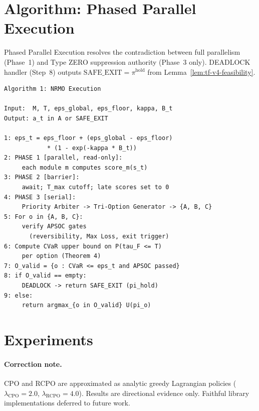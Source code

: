 \section{Algorithm: Phased Parallel Execution}
\label{sec:tf-v4-algorithm}

Phased Parallel Execution resolves the contradiction between full
parallelism (Phase~1) and Type ZERO suppression authority (Phase~3
only). DEADLOCK handler (Step~8) outputs $\mathrm{SAFE\_EXIT} =
\pi^{\mathrm{hold}}$ from Lemma~\ref{lem:tf-v4-feasibility}.

\begin{lstlisting}[basicstyle=\ttfamily\small,frame=single]
Algorithm 1: NRMO Execution

Input:  M, T, eps_global, eps_floor, kappa, B_t
Output: a_t in A or SAFE_EXIT

1: eps_t = eps_floor + (eps_global - eps_floor)
            * (1 - exp(-kappa * B_t))
2: PHASE 1 [parallel, read-only]:
     each module m computes score_m(s_t)
3: PHASE 2 [barrier]:
     await; T_max cutoff; late scores set to 0
4: PHASE 3 [serial]:
     Priority Arbiter -> Tri-Option Generator -> {A, B, C}
5: For o in {A, B, C}:
     verify APSOC gates
       (reversibility, Max Loss, exit trigger)
6: Compute CVaR upper bound on P(tau_F <= T)
     per option (Theorem 4)
7: O_valid = {o : CVaR <= eps_t and APSOC passed}
8: if O_valid == empty:
     DEADLOCK -> return SAFE_EXIT (pi_hold)
9: else:
     return argmax_{o in O_valid} U(pi_o)
\end{lstlisting}

\section{Experiments}
\label{sec:tf-v4-experiments}

\paragraph{Correction note.}
CPO and RCPO are approximated as analytic greedy Lagrangian policies
($\lambda_{\mathrm{CPO}} = 2.0$, $\lambda_{\mathrm{RCPO}} = 4.0$).
Results are directional evidence only. Faithful library
implementations deferred to future work.


